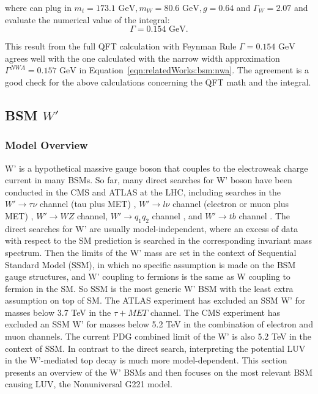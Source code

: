 \noindent where can plug in $m_t= 173.1 \text{ GeV}, m_W= 80.6 \text{ GeV}, g=0.64 $  and $\Gamma_W = 2.07$ and evaluate the numerical value of the integral:
\begin{equation}
         \Gamma = 0.154 \text{ GeV} .
\end{equation} 


\noindent This result from the full QFT calculation with Feynman Rule  $\Gamma = 0.154 \text{ GeV} $ agrees well with the one calculated with the narrow width approximation $\Gamma^{NWA} = 0.157 \text{ GeV} $ in Equation~\ref{eqn:relatedWorks:bsm:nwa}. The agreement is a good check for the above calculations concerning the QFT math and the integral.





 
\subsection{BSM $W'$}
\label{sec:relatedWorks:bsm:WPrime}

\subsubsection{Model Overview}

W' is a hypothetical massive gauge boson that couples to the electroweak charge current in many BSMs. So far, many direct searches for W' boson have been conducted in the CMS and ATLAS at the LHC, including searches in the $W'\to \tau \nu$  channel (tau plus MET) \cite{Sirunyan:2018lbg, Khachatryan:2015pua,Aaboud:2018vgh}, $W'\to l \nu$ channel (electron or muon plus MET) \cite{Sirunyan:2018mpc, Aaboud:2017efa}, $W'\to W Z$ channel\cite{Sirunyan:2018ivv, Aaboud:2017eta}, $W'\to q_1 q_2$ channel \cite{Sirunyan:2016iap, Aaboud:2017yvp}, and $W'\to t b$ channel \cite{Sirunyan:2017vkm, Aaboud:2018juj}. The direct searches for W' are usually model-independent, where an excess of data with respect to the SM prediction is searched in the corresponding invariant mass spectrum. Then the limits of the W' mass are set in the context of Sequential Standard Model (SSM), in which no specific assumption is made on the BSM gauge structures, and W' coupling to fermions is the same as W coupling to fermion in the SM. So SSM is the most generic W' BSM with the least extra assumption on top of SM. The ATLAS experiment has excluded an SSM W' for masses below 3.7 TeV in the $\tau+MET$ channel. The CMS experiment has excluded an SSM W' for masses below 5.2 TeV in the combination of electron and muon channels. The current PDG combined limit of the W' is also 5.2 TeV in the context of SSM. In contrast to the direct search, interpreting the potential LUV in the W'-mediated top decay is much more model-dependent. This section presents an overview of the W' BSMs and then focuses on the most relevant BSM causing LUV, the Nonuniversal G221 model.




